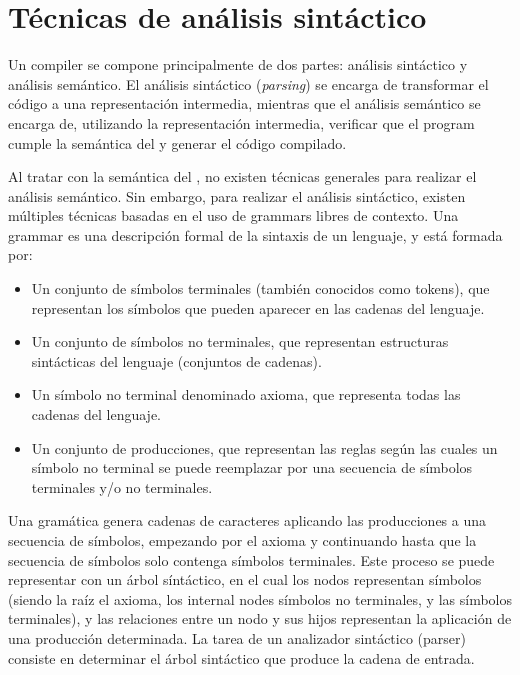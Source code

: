 \section{Técnicas de análisis sintáctico}\label{sec:parser-techniques}

Un \gls{compiler} se compone principalmente de dos partes: análisis sintáctico y
análisis semántico. El análisis sintáctico (\textit{parsing}) se encarga de
transformar el código a una representación intermedia, mientras que el análisis
semántico se encarga de, utilizando la representación intermedia, verificar que
el \gls{program} cumple la semántica del 
y generar el código compilado. \parencite{dragon-book}

Al tratar con la semántica del , no
existen técnicas generales para realizar el análisis semántico. Sin embargo,
para realizar el análisis sintáctico, existen múltiples técnicas basadas en el
uso de \glspl{grammar} libres de contexto. Una \gls{grammar} es una descripción
formal de la sintaxis de un lenguaje, y está formada por:
\parencite{dragon-book}

\begin{itemize}
    \item Un conjunto de símbolos terminales (también conocidos como
    \glspl{token}), que representan los símbolos que pueden aparecer en las
    cadenas del lenguaje.
    \item Un conjunto de símbolos no terminales, que representan estructuras
    sintácticas del lenguaje (conjuntos de cadenas).
    \item Un símbolo no terminal denominado axioma, que representa todas las
    cadenas del lenguaje.
    \item Un conjunto de producciones, que representan las reglas según las
    cuales un símbolo no terminal se puede reemplazar por una secuencia de
    símbolos terminales y/o no terminales.
\end{itemize}

Una gramática genera cadenas de caracteres aplicando las producciones a una
secuencia de símbolos, empezando por el axioma y continuando hasta que la
secuencia de símbolos solo contenga símbolos terminales. Este proceso se puede
representar con un árbol síntáctico, en el cual los nodos representan símbolos
(siendo la raíz el axioma, los \glspl{internal node} símbolos no terminales, y
las  símbolos terminales), y las relaciones entre un
nodo y sus hijos representan la aplicación de una producción determinada. La
tarea de un analizador sintáctico (\gls{parser}) consiste en determinar el árbol
sintáctico que produce la cadena de entrada. \parencite{dragon-book}

